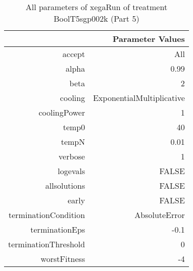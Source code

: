 \begin{table}[ht]
\centering
\begin{tabular}{rr}
  \hline
 & Parameter Values \\ 
  \hline
accept & All \\ 
  alpha & 0.99 \\ 
  beta & 2 \\ 
  cooling & ExponentialMultiplicative \\ 
  coolingPower & 1 \\ 
  temp0 & 40 \\ 
  tempN & 0.01 \\ 
  verbose & 1 \\ 
  logevals & FALSE \\ 
  allsolutions & FALSE \\ 
  early & FALSE \\ 
  terminationCondition & AbsoluteError \\ 
  terminationEps & -0.1 \\ 
  terminationThreshold & 0 \\ 
  worstFitness & -4 \\ 
   \hline
\end{tabular}
\caption{ All parameters of xegaRun of treatment BoolT5sgp002k 
 (Part 5)} 
\end{table}
